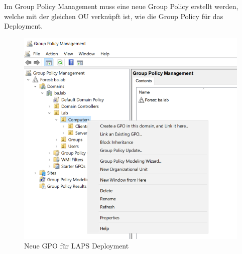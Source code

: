 Im Group Policy Management muss eine neue Group Policy erstellt werden, welche mit der gleichen OU verknüpft ist, wie die Group Policy für das Deployment.
\begin{figure}[H]
    \centering
    \includegraphics[width=0.7\linewidth]{../img/LAPS/GPO-Create-New.png}
    \caption{Neue GPO für LAPS Deployment}
\end{figure}
%
%
%
%